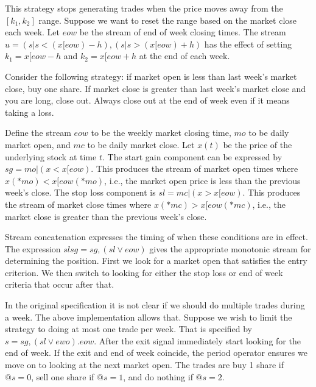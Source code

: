 \documentclass[12pt,letterpaper,fleqn]{report}
\begin{document}
This strategy stops generating trades when the price moves away
from the \([k_1,k_2]\) range. Suppose we want to reset the
range based on the market close each week. Let \(eow\) be
the stream of end of week closing times. The stream
\(u = (s|s < (x[eow) - h),(s|s > (x[eow) + h)\) has the effect of
setting \(k_1 = x[eow - h\) and \(k_2 = x[eow + h\) at the
end of each week.

Consider the following strategy:
if market open is less than last week's market close, buy one share.
If market close is greater than last week's market close and you are long, close out.
Always close out at the end of week even if it means taking a loss.

Define the stream \(eow\) to be the weekly market closing time,
\(mo\) to be daily market open, and \(mc\) to be daily market close. Let
\(x(t)\) be the price of the underlying stock at time \(t\).
The start gain component can be expressed by \(sg = mo|(x < x[eow)\). 
This produces the
stream of market open times where \(x(*mo) < x[eow(*mo)\), i.e.,
the market open price is less than the previous week's close.
The stop loss component is \(sl = mc|(x > x[eow)\). This produces the
stream of market close times where \(x(*mc) > x[eow(*mc)\), i.e.,
the market close is greater than the previous week's close.

Stream concatenation expresses the timing of when these conditions
are in effect. The expression \(slsg = sg,(sl\vee eow)\) gives the
appropriate monotonic stream for determining the position. First
we look for a market open that satisfies the entry criterion. We
then switch to looking for either the stop loss or end of week
criteria that occur after that.

In the original specification it is not clear if we should do multiple
trades during a week. The above implementation allows that. Suppose
we wish to limit the strategy to doing at most one trade per week.
That is specified by \(s = sg,(sl\vee ewo).eow\).
After the exit signal immediately start looking for the end of week.
If the exit and end of week coincide, the period operator ensures
we move on to looking at the next market open.
The trades are buy 1 share if \(@s = 0\), sell one share if \(@s = 1\), and do
nothing if \(@s = 2\).
\end{document}
